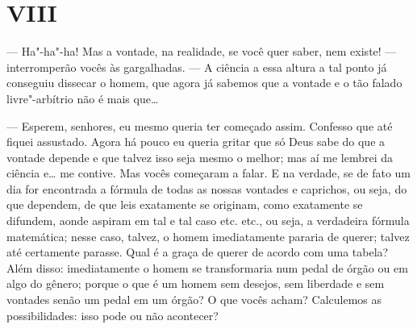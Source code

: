 \section{VIII}

--- Ha"-ha"-ha! Mas a vontade, na realidade, se você quer saber, nem existe!
--- interromperão vocês às gargalhadas. --- A ciência a essa altura a tal
ponto já conseguiu dissecar o homem, que agora já sabemos que a vontade
e o tão falado livre{}"-arbítrio não é mais que\ldots{}

--- Esperem, senhores, eu mesmo queria ter começado assim. Confesso que
até fiquei assustado. Agora há pouco eu queria gritar que só Deus sabe
do que a vontade depende e que talvez isso seja mesmo o melhor; mas aí
me lembrei da ciência e\ldots{} me contive. Mas vocês começaram a falar. E
na verdade, se de fato um dia for encontrada a fórmula de todas as
nossas vontades e caprichos, ou seja, do que dependem, de que leis
exatamente se originam, como exatamente se difundem, aonde aspiram em
tal e tal caso etc. etc., ou seja, a verdadeira fórmula matemática;
nesse caso, talvez, o homem imediatamente pararia de querer; talvez até
certamente parasse. Qual é a graça de querer de acordo com uma tabela?
Além disso: imediatamente o homem se transformaria num pedal de órgão
ou em algo do gênero; porque o que é um homem sem desejos, sem
liberdade e sem vontades senão um pedal em um órgão? O que vocês
acham? Calculemos as possibilidades: isso pode ou não acontecer?

